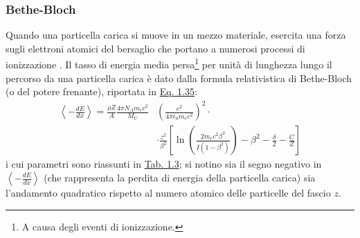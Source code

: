 \documentclass[12pt,a4paper,twoside]{report}
\begin{document}
	\subsubsection{Bethe-Bloch}\label{par:bethe_bloch}
	Quando una particella carica si muove in un mezzo materiale, esercita una forza sugli elettroni atomici del bersaglio che portano a numerosi processi di ionizzazione \cite{Christodoulides2016}. Il tasso di energia media persa\footnote{A causa degli eventi di ionizzazione.} per unità di lunghezza lungo il percorso da una particella carica è dato dalla formula relativistica di Bethe-Bloch (o del potere frenante), riportata in \hyperref[eq:bethe_bloch]{Eq. 1.35}:
	\begin{equation}
		\begin{split}
			\left\langle-\frac{dE}{dx} \right\rangle=\frac{\rho Z}{A}\frac{4\pi N_Am_ec^2}{M_U}&\left(\frac{e^2}{4\pi\epsilon_0m_ec^2}\right)^2\cdot\\
			&\cdot\frac{z^2}{\beta^2}\left[\ln{\left(\frac{2m_ec^2\beta^2}{I\left(1-\beta^2\right)}\right)}-\beta^2-\frac{\delta}{2}-\frac{C}{Z}\right]
		\end{split}
		\label{eq:bethe_bloch}
	\end{equation}
	i cui parametri sono riassunti in \hyperref[tab:bethe_bloch]{Tab. 1.3}; si notino sia il segno negativo in $\left\langle-\frac{dE}{dx} \right\rangle$ (che rappresenta la perdita di energia della particella carica) sia l'andamento quadratico rispetto al numero atomico delle particelle del fascio $z$.
\end{document}
